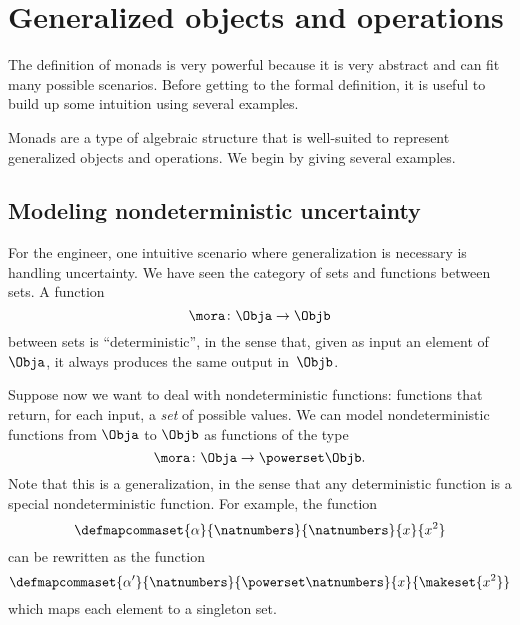 
\section{Generalized objects and operations}

The definition of monads is very powerful because it is very abstract and can fit many possible scenarios.
Before getting to the formal definition, it is useful to build up some intuition using several examples.

Monads are a type of algebraic structure that is well-suited to represent generalized objects and operations.
We begin by giving several examples.

\subsection{Modeling nondeterministic uncertainty}

For the engineer, one intuitive scenario where generalization is necessary is handling uncertainty.
We have seen the category  \Set of sets and functions between sets.
A function
\begin{equation}
    \label{eq:monad-simple}
    \mora\colon\Obja\to\Objb
\end{equation}
between sets is ``deterministic'', in the sense that, given as input an element of~$\Obja$, it always produces the same output in~$\Objb$.

Suppose now we want to deal with nondeterministic functions: functions that return, for each input, a \emph{set} of possible values.
We can model nondeterministic functions from $\Obja$ to $\Objb$ as functions of the type
\begin{equation}
    \label{eq:monad-generalized}
    \mora\colon\Obja\to\powerset\Objb.
\end{equation}
%
Note that this is a generalization, in the sense that any deterministic function is a special nondeterministic function.
For example, the function
%
\begin{equation}
    \label{eq:monad-alpha-example1}
    \defmapcommaset{
        \alpha
    }{
        \natnumbers
    }{
        \natnumbers
    }{
        x
    }{
        x^2
    }
\end{equation}
%
can be rewritten as the function
%
\begin{equation}
    \label{eq:monad-alpha-example2}
    \defmapcommaset{
        \alpha'
    }{
        \natnumbers
    }{
        \powerset\natnumbers
    }{
        x
    }{
        \makeset{x^2}
    }
\end{equation}
%
which maps each element to a singleton set.

